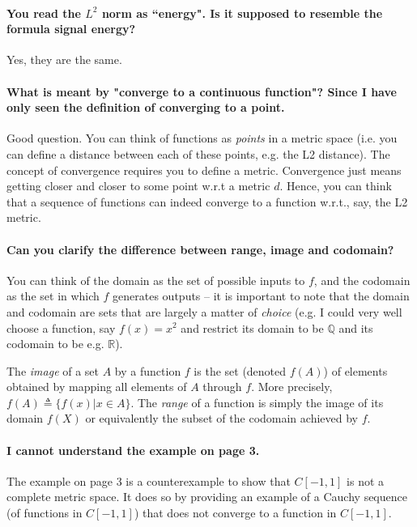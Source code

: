 \documentclass[10pt,english]{article}
\begin{document}
\paragraph{You read the $L^2$ norm as ``energy". Is it supposed to resemble the formula signal energy?} 
Yes, they are the same.

\paragraph{What is meant by "converge to a continuous function"? Since I have only seen the definition of converging to a point.}

Good question. You can think of functions as \textit{points} in a metric space (i.e. you can define a distance between each of these points, e.g. the L2 distance). The concept of convergence requires you to define a metric. Convergence just means getting closer and closer to some point w.r.t a metric $d$. Hence, you can think that a sequence of functions can indeed converge to a function w.r.t., say, the L2 metric.



\paragraph{Can you clarify the difference between range, image and codomain?}
You can think of the domain as the set of possible inputs to $f$, and the codomain as the set in which $f$ generates outputs -- it is important to note that the domain and codomain are sets that are largely a matter of \textit{choice} (e.g. I could very well choose a function, say $f(x) = x^2$ and restrict its domain to be $\mathbb{Q}$ and its codomain to be e.g. $\mathbb{R}$).

The \textit{image} of a set $A$ by a function $f$ is the set (denoted $f(A)$) of elements obtained by mapping all elements of $A$ through $f$. More precisely, $f(A) \triangleq \{f(x) | x\in A\}$.
The \textit{range} of a function is simply the image of its domain $f(X)$ or equivalently the subset of the codomain achieved by $f$.

\paragraph{I cannot understand the example on page 3.}

The example on page 3 is a counterexample to show that $C[-1,1]$ is not a complete metric space.
It does so by providing an example of a Cauchy sequence (of functions in $C[-1,1]$) that does not converge to a function in $C[-1,1]$.
\end{document}
